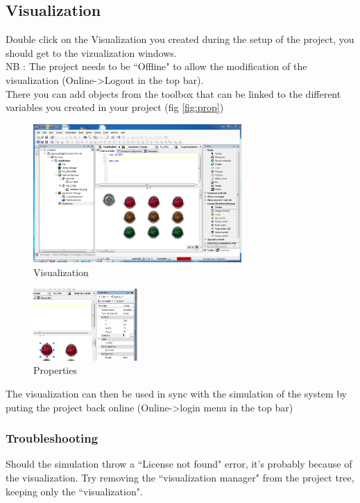 \documentclass[10pt,a4paper]{article}
\begin{document}
\subsection{Visualization}

Double click on the Visualization you created during the setup of the project, you should get to the vizualization windows.\\
NB : The project needs to be ``Offline" to allow the modification of the visualization (Online->Logout in the top bar).\\
There you can add objects from the toolbox that can be linked to the different variables you created in your project (fig \vref{fig:prop})

\begin{figure}[h!]
	\begin{center}
		\includegraphics[width=300px]{img11.PNG}
	\end{center}
\caption{Visualization}
\label{fig:visu}
\end{figure}


\begin{figure}[h!]
	\begin{center}
		\includegraphics[width=150px]{img12.png}
	\end{center}
\caption{Properties}
\label{fig:prop}
\end{figure}

The visualization can then be used in sync with the simulation of the system by puting the project back online (Online->login menu in the top bar)

\subsubsection{Troubleshooting}
Should the simulation throw a ``License not found" error, it's probably because of the visualization.
Try removing the ``visualization manager" from the project tree, keeping only the ``visualization".
\end{document}
